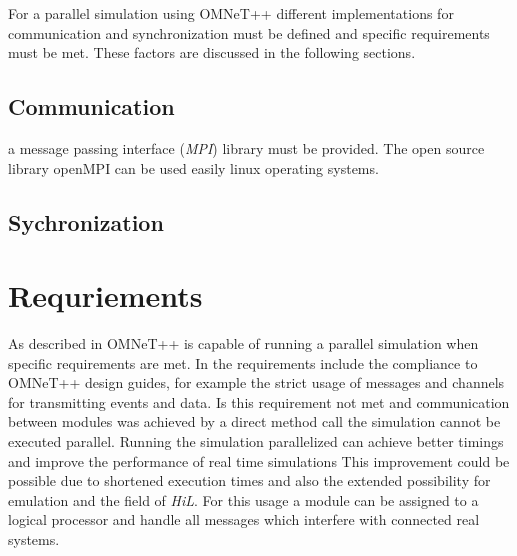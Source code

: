 For a parallel simulation using OMNeT++ different implementations for communication and synchronization must be defined and specific requirements must be met.
These factors are discussed in the following sections.

\subsection{Communication}
\label{sec:parallel_omnet_comm}

a message passing interface (\emph{MPI}) library must be provided.
The open source library openMPI can be used easily linux operating systems.


\subsection{Sychronization}
\label{sec:parallel_omnet_sync}

\section{Requriements}
\label{sec:parallel_omnet_requirements}

As described in \cite{varga_parallel_2003} OMNeT++ is capable of running a parallel simulation when specific requirements are met.
In \cite{varga_parallel_2003} the requirements include the compliance to OMNeT++ design guides, for example the strict usage of messages and channels for transmitting events and data.
Is this requirement not met and communication between modules was achieved by a direct method call the simulation cannot be executed parallel.
Running the simulation parallelized can achieve better timings and improve the performance of real time simulations
This improvement could be possible due to shortened execution times and also the extended possibility for emulation and the field of \emph{HiL}.
For this usage a module can be assigned to a logical processor and handle all messages which interfere with connected real systems.